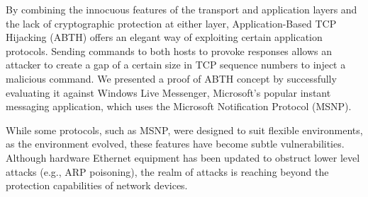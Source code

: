 \documentclass{sig-alternate}
\begin{document}
By combining the innocuous features of the transport and application layers and the lack of cryptographic protection at either layer, Application-Based TCP Hijacking (ABTH) offers an elegant way of exploiting certain application protocols.
Sending commands to both hosts to provoke responses allows an attacker to create a gap of a certain size in TCP sequence numbers to inject a malicious command. We presented a proof of ABTH concept by successfully evaluating it against Windows Live Messenger, Microsoft's popular instant messaging application, which uses the Microsoft Notification Protocol (MSNP).

While some protocols, such as MSNP, were designed to suit flexible environments, as the environment evolved, these features have become subtle vulnerabilities. Although hardware Ethernet equipment has been updated to obstruct lower level attacks (e.g., ARP poisoning), the realm of attacks is reaching beyond the protection capabilities of network devices.



\end{document}
